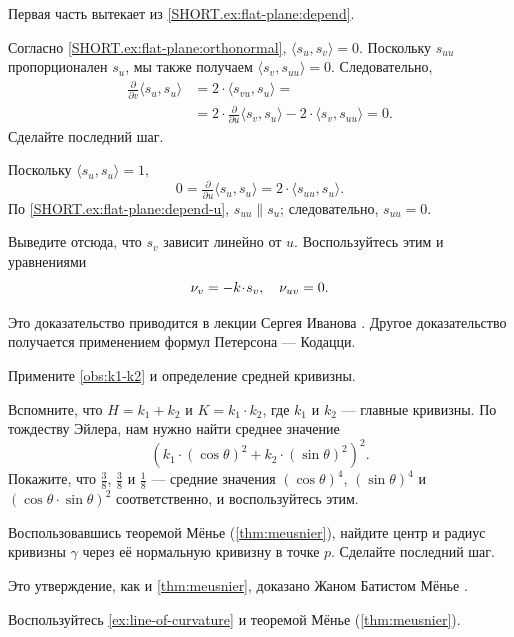 Первая часть вытекает из \ref{SHORT.ex:flat-plane:depend}.

Согласно \ref{SHORT.ex:flat-plane:orthonormal}, $\langle s_u,s_v\rangle=0$.
Поскольку $s_{uu}$ пропорционален $s_u$, мы также получаем $\langle s_{v},s_{uu}\rangle=0$.
Следовательно,
\begin{align*}
\tfrac{\partial}{\partial v}\langle s_u,s_u\rangle&=2\cdot \langle s_{vu},s_u\rangle=
\\
&=2\cdot \tfrac{\partial}{\partial u}\langle s_v,s_u\rangle-2\cdot \langle s_{v},s_{uu}\rangle=0.
\end{align*}
Сделайте последний шаг.

Поскольку $\langle s_u,s_u\rangle=1$,
\[0=\tfrac{\partial}{\partial u}\langle s_u,s_u\rangle=2\cdot\langle s_{uu},s_u\rangle.\]
По \ref{SHORT.ex:flat-plane:depend-u}, $s_{uu}\parallel s_u$; следовательно, $s_{uu}=0$.

Выведите отсюда, что $s_v$ зависит линейно от $u$.
Воспользуйтесь этим и уравнениями
\[\Norm_v=-k\cdot s_v,\quad \Norm_{uv}=0.\]

Это доказательство приводится в лекции Сергея Иванова \cite[3-й сем. Лекция 13]{ivanov}.
Другое доказательство получается применением формул Петерсона --- Кодацци.

\setcounter{eqtn}{0}

Примените \ref{obs:k1-k2} и определение средней кривизны.

Вспомните, что $H=k_1+k_2$ и $K=k_1\cdot k_2$, где $k_1$ и $k_2$ --- главные кривизны.
По тождеству Эйлера, нам нужно найти среднее значение
\[(k_1\cdot (\cos\theta)^2+k_2\cdot (\sin\theta)^2)^2.\]
Покажите, что $\tfrac38$, $\tfrac38$ и $\tfrac18$ --- средние значения $(\cos\theta)^4$, $(\sin\theta)^4$ и $(\cos\theta\cdot \sin\theta)^2$ соответственно, и воспользуйтесь этим.

Воспользовавшись теоремой Мёнье (\ref{thm:meusnier}), найдите центр и радиус кривизны $\gamma$ через её нормальную кривизну в точке $p$.
Сделайте последний шаг.

Это утверждение, как и \ref{thm:meusnier}, доказано Жаном Батистом Мёнье \cite{meusnier}.

Воспользуйтесь \ref{ex:line-of-curvature} и теоремой Мёнье (\ref{thm:meusnier}).

